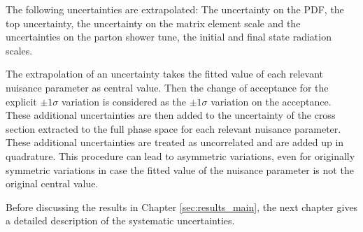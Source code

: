 The following uncertainties are extrapolated:
The uncertainty on the PDF, the top \pt uncertainty, the uncertainty on the matrix element scale and the uncertainties on the parton shower tune, the initial and final state radiation scales.

The extrapolation of an uncertainty takes the fitted value of each relevant nuisance parameter as central value. Then the change of acceptance for the explicit $\pm 1 \sigma$ variation is considered as the $\pm 1 \sigma$ variation on the acceptance. These additional uncertainties are then added to the uncertainty of the cross section extracted to the full phase space for each relevant nuisance parameter. These additional uncertainties are treated as uncorrelated and are added up in quadrature. This procedure can lead to asymmetric variations, even for originally symmetric variations in case the fitted value of the nuisance parameter is not the original central value.

Before discussing the results in Chapter \ref{sec:results_main}, the next chapter gives a detailed description of the systematic uncertainties.

